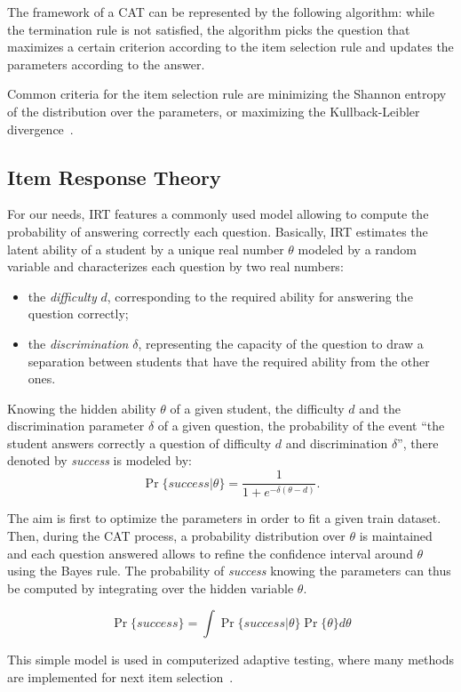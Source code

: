 \documentclass{sig-alternate}
\begin{document}
The framework of a CAT can be represented by the following algorithm: while the termination rule is not satisfied, the algorithm picks the question that maximizes a certain criterion according to the item selection rule and updates the parameters according to the answer.

Common criteria for the item selection rule are minimizing the Shannon entropy of the distribution over the parameters, or maximizing the Kullback-Leibler divergence~\citep{Xu2003}.

\subsection{Item Response Theory}

For our needs, IRT features a commonly used model allowing to compute the probability of answering correctly each question. Basically, IRT estimates the latent ability of a student by a unique real number $\theta$ modeled by a random variable and characterizes each question by two real numbers:

\begin{itemize}
\item the \emph{difficulty} $d$, corresponding to the required ability for answering the question correctly;
\item the \emph{discrimination} $\delta$, representing the capacity of the question to draw a separation between students that have the required ability from the other ones.
\end{itemize}

Knowing the hidden ability $\theta$ of a given student, the difficulty $d$ and the discrimination parameter $\delta$ of a given question, the probability of the event ``the student answers correctly a question of difficulty $d$ and discrimination $\delta$'', there denoted by \emph{success} is modeled by:
\[ \Pr\{success|\theta\} = \frac1{1+e^{-\delta(\theta - d)}}. \]

The aim is first to optimize the parameters in order to fit a given train dataset. Then, during the CAT process, a probability distribution over $\theta$ is maintained and each question answered allows to refine the confidence interval around $\theta$ using the Bayes rule. The probability of \emph{success} knowing the parameters can thus be computed by integrating over the hidden variable $\theta$.

\[ \Pr\{success\} = \int \Pr\{success|\theta\} \Pr\{\theta\} d\theta \]

This simple model is used in computerized adaptive testing, where many methods are implemented for next item selection~\citep{MagisRaiche2012}.
\end{document}
